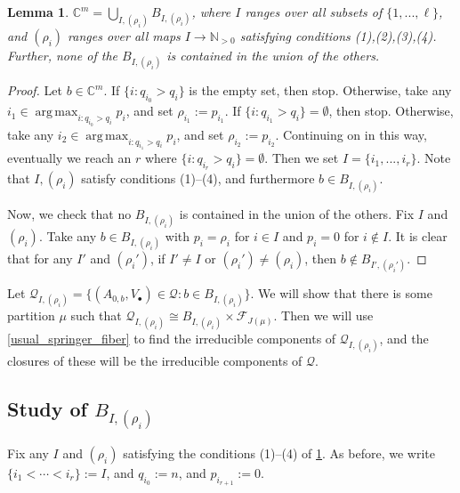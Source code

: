 \documentclass[12pt,psamsfonts]{article}
\DeclareMathOperator*{\argmax}{arg\,max}
\newtheorem{lemma}[theorem]{Lemma}
\begin{document}
\begin{lemma}\label{bs_union}
    \(\mathbb{C}^m = \bigcup_{I, (\rho_i)} B_{I, (\rho_i)}\), where \(I\) ranges over all subsets of \(\{1, ..., \ell\}\), and \((\rho_i)\) ranges over all maps \(I \to \mathbb{N}_{>0}\) satisfying conditions (1),(2),(3),(4).
    Further, none of the \(B_{I, (\rho_i)}\) is contained in the union of the others.
\end{lemma}
\begin{proof}
    Let \(b \in \mathbb{C}^m\).
    If \(\{i : q_{i_0} > q_i\}\) is the empty set, then stop.
    Otherwise, take any \(i_1 \in \argmax_{i : q_{i_0} > q_i} p_i\), and set \(\rho_{i_1} := p_{i_1}\).
    If \(\{i : q_{i_1} > q_i\} = \emptyset\), then stop.
    Otherwise, take any \(i_2 \in \argmax_{i : q_{i_1} > q_i} p_i\), and set \(\rho_{i_2} := p_{i_2}\).
    Continuing on in this way, eventually we reach an \(r\) where \(\{i : q_{i_r} > q_i\} = \emptyset\).
    Then we set \(I = \{i_1, ..., i_r\}\).
    Note that \(I, (\rho_i)\) satisfy conditions (1)--(4), and furthermore \(b \in B_{I, (\rho_i)}\).
    \par Now, we check that no \(B_{I, (\rho_i)}\) is contained in the union of the others.
    Fix \(I\) and \((\rho_i)\).
    Take any \(b \in B_{I, (\rho_i)}\) with \(p_i = \rho_i\) for \(i \in I\) and \(p_i = 0\) for \(i \notin I\).
    It is clear that for any \(I'\) and \((\rho_i')\), if \(I' \neq I\) or \((\rho_i') \neq (\rho_i)\), then \(b \notin B_{I', (\rho_i')}\).
\end{proof}
\par Let \(\mathcal{Q}_{I, (\rho_i)} = \{(A_{0, b}, V_\bullet) \in \mathcal{Q} : b \in B_{I, (\rho_i)}\}\).
We will show that there is some partition \(\mu\) such that \(\mathcal{Q}_{I, (\rho_i)} \cong B_{I, (\rho_i)} \times \mathcal{F}_{J(\mu)}\).
Then we will use \cref{usual_springer_fiber} to find the irreducible components of \(\mathcal{Q}_{I, (\rho_i)}\), and the closures of these will be the irreducible components of \(\mathcal{Q}\).

\subsection{Study of \texorpdfstring{\(B_{I, (\rho_i)}\)}{B\_\{I, (p\_i)\}}}
Fix any \(I\) and \((\rho_i)\) satisfying the conditions (1)--(4) of \cref{bs_union}.
As before, we write \(\{i_1 < \cdots < i_r\} := I\), and \(q_{i_0} := n\), and \(p_{i_{r + 1}} := 0\).
\end{document}
